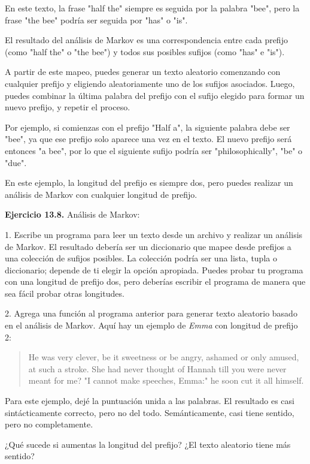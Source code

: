 En este texto, la frase "half the" siempre es seguida por la palabra "bee", pero la frase "the bee" podría ser seguida por "has" o "is".

El resultado del análisis de Markov es una correspondencia entre cada prefijo (como "half the" o "the bee") y todos sus posibles sufijos (como "has" e "is").

A partir de este mapeo, puedes generar un texto aleatorio comenzando con cualquier prefijo y eligiendo aleatoriamente uno de los sufijos asociados. Luego, puedes combinar la última palabra del prefijo con el sufijo elegido para formar un nuevo prefijo, y repetir el proceso.

Por ejemplo, si comienzas con el prefijo "Half a", la siguiente palabra debe ser "bee", ya que ese prefijo solo aparece una vez en el texto. El nuevo prefijo será entonces "a bee", por lo que el siguiente sufijo podría ser "philosophically", "be" o "due".

En este ejemplo, la longitud del prefijo es siempre dos, pero puedes realizar un análisis de Markov con cualquier longitud de prefijo.

\textbf{Ejercicio 13.8.} Análisis de Markov:

1. Escribe un programa para leer un texto desde un archivo y realizar un análisis de Markov. El resultado debería ser un diccionario que mapee desde prefijos a una colección de sufijos posibles. La colección podría ser una lista, tupla o diccionario; depende de ti elegir la opción apropiada. Puedes probar tu programa con una longitud de prefijo dos, pero deberías escribir el programa de manera que sea fácil probar otras longitudes.

2. Agrega una función al programa anterior para generar texto aleatorio basado en el análisis de Markov. Aquí hay un ejemplo de \textit{Emma} con longitud de prefijo 2:

\begin{quote}
He was very clever, be it sweetness or be angry, ashamed or only amused, at such a stroke. She had never thought of Hannah till you were never meant for me? "I cannot make speeches, Emma:" he soon cut it all himself.
\end{quote}

Para este ejemplo, dejé la puntuación unida a las palabras. El resultado es casi sintácticamente correcto, pero no del todo. Semánticamente, casi tiene sentido, pero no completamente.

¿Qué sucede si aumentas la longitud del prefijo? ¿El texto aleatorio tiene más sentido?

